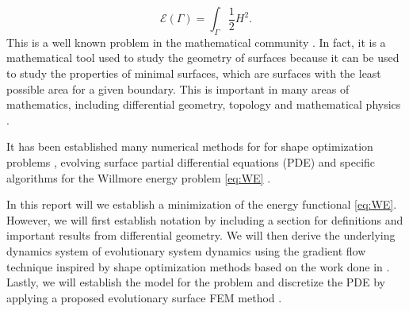 \begin{equation}
\label{eq:WE}
\mathcal{E} \left( \Gamma  \right) = \int_{\Gamma }^{} \frac{1}{2} H ^2
.\end{equation}
This is a well known problem in the mathematical community \cite{ topping2000towards, marques2014willmore,link2013gradient}. In fact, it is a mathematical tool used to study the geometry of surfaces because it can be used to study the properties of minimal surfaces, which are surfaces with the least possible area for a given boundary. This is important in many areas of mathematics, including differential geometry, topology and mathematical physics \cite{koerber2021area,jakob2022singularities, rupp21}.



It has been established many numerical methods for for shape optimization problems \cite{sokolowski1992introduction,ito2008variational}, evolving surface partial differential equations (PDE) \cite{dziuk2013finite, dziuk2007finite,
binz2022convergent, barrett2007parametric, barrett2007variational, kovacs2019convergent} and specific
algorithms for the Willmore energy problem \eqref{eq:WE} \cite{palmurella2022parametric, dziuk2008computational, bonito2010parametric,  kovacs2021convergent, hu2022evolving}.

In this report will we establish a minimization of the energy functional \eqref{eq:WE}. However, we will first establish notation by including a section for definitions and important results from differential geometry. We will then derive the
underlying dynamics system of evolutionary system dynamics using the gradient flow technique inspired by shape optimization methods based on the work done in \cite{ dougan2012first}. Lastly, we will establish the model for the problem and discretize the
PDE by applying a proposed evolutionary surface FEM method \cite{kovacs2021convergent}.



